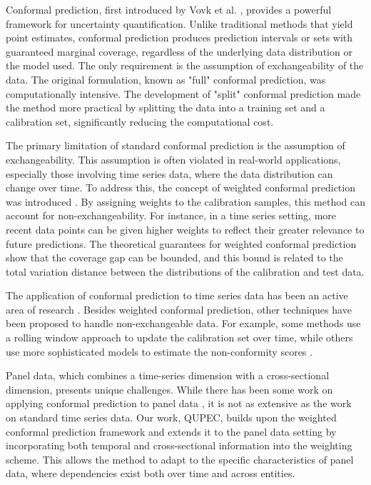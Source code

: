 Conformal prediction, first introduced by Vovk et al. \cite{vovk2005algorithmic}, provides a powerful framework for uncertainty quantification. Unlike traditional methods that yield point estimates, conformal prediction produces prediction intervals or sets with guaranteed marginal coverage, regardless of the underlying data distribution or the model used. The only requirement is the assumption of exchangeability of the data. The original formulation, known as "full" conformal prediction, was computationally intensive. The development of "split" conformal prediction \cite{papadopoulos2002inductive} made the method more practical by splitting the data into a training set and a calibration set, significantly reducing the computational cost.

The primary limitation of standard conformal prediction is the assumption of exchangeability. This assumption is often violated in real-world applications, especially those involving time series data, where the data distribution can change over time. To address this, the concept of weighted conformal prediction was introduced \cite{tibshirani2019conformal}. By assigning weights to the calibration samples, this method can account for non-exchangeability. For instance, in a time series setting, more recent data points can be given higher weights to reflect their greater relevance to future predictions. The theoretical guarantees for weighted conformal prediction show that the coverage gap can be bounded, and this bound is related to the total variation distance between the distributions of the calibration and test data.

The application of conformal prediction to time series data has been an active area of research \cite{stankeviciute2021conformal, gibbs2021adaptive, zaffran2022adaptive}. Besides weighted conformal prediction, other techniques have been proposed to handle non-exchangeable data. For example, some methods use a rolling window approach to update the calibration set over time, while others use more sophisticated models to estimate the non-conformity scores \cite{xu2021conformal}.

Panel data, which combines a time-series dimension with a cross-sectional dimension, presents unique challenges. While there has been some work on applying conformal prediction to panel data \cite{dunn2022distribution, chernozhukov2021distributional, oliveira2022split}, it is not as extensive as the work on standard time series data. Our work, QUPEC, builds upon the weighted conformal prediction framework and extends it to the panel data setting by incorporating both temporal and cross-sectional information into the weighting scheme. This allows the method to adapt to the specific characteristics of panel data, where dependencies exist both over time and across entities.
